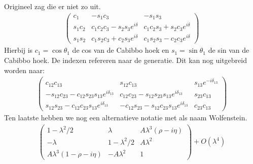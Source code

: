 \documentclass[../main.tex]{subfiles}
\begin{document}
Origineel zag die er niet zo uit.
\begin{equation}
    \begin{aligned}
        \label{eq:ckm_origineel}
        \left(\begin{array}{ccc}
                c_{1} & -s_{1} c_{3} & -s_{1} s_{3} \\
                s_{1} c_{2} & c_{1} c_{2} c_{3}-s_{2} s_{3} e^{i \delta} & c_{1} c_{2} s_{3}+s_{2} c_{3} e^{i \delta} \\
                s_{1} s_{2} & c_{1} s_{2} c_{3}+c_{2} s_{3} e^{i \delta} & c_{1} s_{2} s_{3}-c_{2} c_{3} e^{i \delta}
        \end{array}\right)
    \end{aligned}
\end{equation}
Hierbij is $c_1 = \cos\theta_1$ de cos van de Cabibbo hoek en $s_1 = \sin\theta_1$ de sin van de Cabibbo hoek. De indexen refereren naar de generatie. Dit kan nog uitgebreid worden naar:
\begin{equation}
    \begin{aligned}
        \label{eq:ckm_uitgebreid}
        \left(\begin{array}{ccc}
                c_{12} c_{13} & s_{12} c_{13} & s_{13} e^{-i \delta_{13}} \\
                -s_{12} c_{23}-c_{12} s_{23} s_{13} e^{i \delta_{13}} & c_{12} c_{23}-s_{12} s_{23} s_{13} e^{i \delta_{13}} & s_{23} c_{13} \\
                s_{12} s_{23}-c_{12} c_{23} s_{13} e^{i \delta_{13}} & -c_{12} s_{23}-s_{12} c_{23} s_{13} e^{i \delta_{13}} & c_{23} c_{13}
        \end{array}\right)
    \end{aligned}
\end{equation}
Ten laatste hebben we nog een alternatieve notatie met als naam Wolfenstein.
\begin{equation}
    \begin{aligned}
        \label{eq:wolfenstein_ckm}
        \left(\begin{array}{ccc}
                1-\lambda^{2} / 2 & \lambda & A \lambda^{3}(\rho-i \eta) \\
                -\lambda & 1-\lambda^{2} / 2 & A \lambda^{2} \\
                A \lambda^{3}(1-\rho-i \eta) & -A \lambda^{2} & 1
        \end{array}\right)+O\left(\lambda^{4}\right)
    \end{aligned}
\end{equation}
\end{document}
